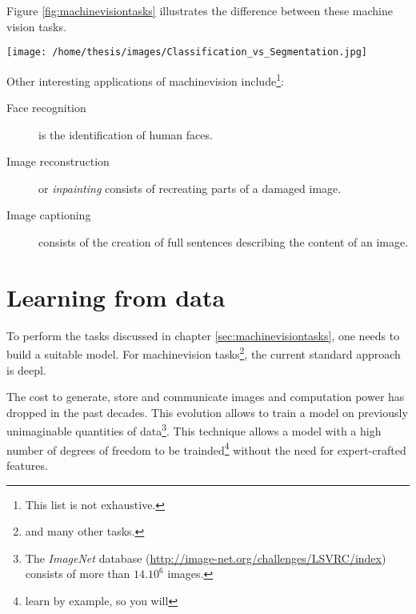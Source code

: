 Figure \ref{fig:machinevisiontasks} illustrates the difference between these machine vision tasks. 

\begin{SCfigure}[][h!]
    \centering
    \texttt{[image: /home/thesis/images/Classification\_vs\_Segmentation.jpg]}
    \caption{Illustration to compare different Machine vision tasks \cite{SemTorch76:online}. 
    Object detection means that the location of several objects is estimated by the model. This is indicated by the \textit{bounding boxes}.
    Segmentation of an image is classifying each pixel in the correct class or assigning it to the \textit{background} class.
    Semantic segmentation makes no difference between different instances of the same semantic class, instance segmentation does.
    \label{fig:machinevisiontasks}}
\end{SCfigure}

Other interesting applications of \gls{machinevision} include\footnote{This list is not exhaustive.}:
\begin{description}
    \item[Face recognition] is the identification of human faces. 
    \item[Image reconstruction] or \textit{inpainting} consists of recreating parts of a damaged image.
    \item[Image captioning] consists of the creation of full sentences describing the content of an image.    
\end{description}

\section{Learning from data}

To perform the tasks discussed in chapter \ref{sec:machinevisiontasks}, one needs to build a suitable model.
For \Gls{machinevision} tasks\footnote{and many other tasks.}, the current standard approach is \Gls{deepl}.


The cost to generate, store and communicate images and computation power has dropped in the past decades.
This evolution allows to train a model  on previously unimaginable quantities of data\footnote{The \textit{ImageNet} database (\url{http://image-net.org/challenges/LSVRC/index}) consists of more than $14.10^6$ images.}.
This technique allows a model with a high number of degrees of freedom to be trainded\footnote{learn by example, so you will} without the need for expert-crafted features. 


